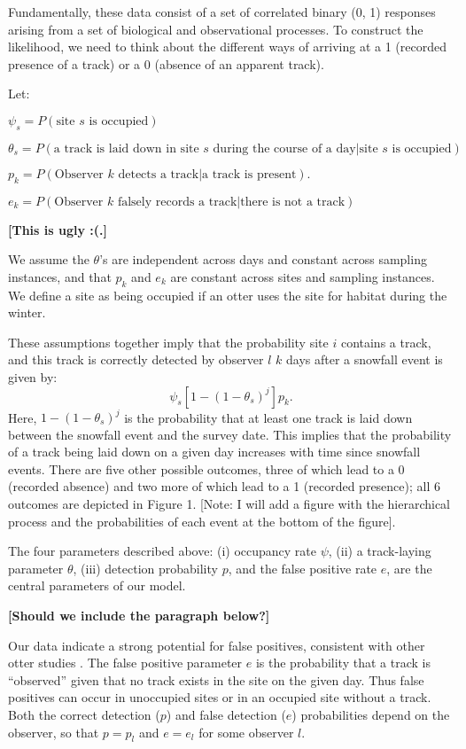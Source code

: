 \documentclass[11pt]{article}
\begin{document}
    Fundamentally, these data consist of a set of correlated binary (0, 1)
    responses arising from a set of biological and observational processes.  To
    construct the likelihood, we need to think about the different ways of
    arriving at a 1 (recorded presence of a track) or a 0 (absence of an
    apparent track).

    Let:

    $\psi_s=P(\mbox{site } s \mbox{ is occupied})$

    $\theta_s=P(\mbox{a track is laid down in site } s \mbox{ during the course
    of a day} | \mbox{site } s \mbox{ is occupied})$

    $p_k=P(\mbox{Observer } k \mbox{ detects a track} | \mbox{a track is
    present}).$

    $e_k=P(\mbox{Observer } k \mbox{ falsely records a track}| \mbox{there is
    not a track})$

    \textbf{[This is ugly :(.]}

    We assume the $\theta$'s are independent across days and constant across
    sampling instances, and that $p_k$ and $e_k$ are constant across sites and
    sampling instances. We define a site as being occupied if an otter uses the
    site for habitat during the winter.

    These assumptions together imply that the probability site $i$ contains a
    track, and this track is correctly detected by observer $l$ $k$ days after
    a snowfall event is given by: \[\psi_s [1-(1- \theta_s)^j] p_k\text{.}\]
    Here, $1-(1- \theta_s)^j$ is the probability that at least one track is
    laid down between the snowfall event and the survey date. This implies that
    the probability of a track being laid down on a given day increases with
    time since snowfall events.  There are five other possible outcomes, three
    of which lead to a 0 (recorded absence) and two more of which lead to a 1
    (recorded presence); all 6 outcomes are depicted in Figure 1. [Note:  I
    will add a figure with the hierarchical process and the probabilities of
    each event at the bottom of the figure].

    The four parameters described above: (i) occupancy rate $\psi$, (ii) a
    track-laying parameter $\theta$, (iii) detection probability $p$, and the
    false positive rate $e$, are the central parameters of our model.

    \textbf{[Should we include the paragraph below?]}

    Our data indicate a strong potential for false positives, consistent with
    other otter studies \citep{Evans2009}. The false positive parameter $e$ is
    the probability that a track is ``observed'' given that no track exists in
    the site on the given day. Thus false positives can occur in unoccupied
    sites or in an occupied site without a track. Both the correct detection
    ($p$) and false detection ($e$) probabilities depend on the observer, so
    that $p=p_l$ and $e=e_l$ for some observer \(l\).
\end{document}
